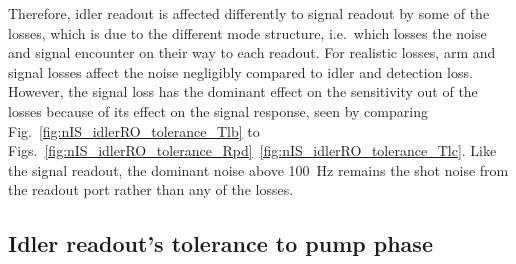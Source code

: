 Therefore, idler readout is affected differently to signal readout by some of the losses, which is due to the different mode structure, i.e.\ which losses the noise and signal encounter on their way to each readout.
For realistic losses, arm and signal losses affect the noise negligibly compared to idler and detection loss. However, the signal loss has the dominant effect on the sensitivity out of the losses because of its effect on the signal response, seen by comparing Fig.~\ref{fig:nIS_idlerRO_tolerance_Tlb} to Figs.~\ref{fig:nIS_idlerRO_tolerance_Rpd}~\ref{fig:nIS_idlerRO_tolerance_Tlc}.  Like the signal readout, the dominant noise above 100~Hz remains the shot noise from the readout port rather than any of the losses.



\subsection{Idler readout's tolerance to pump phase}
\label{sec:idlerRO_pump_phase}

